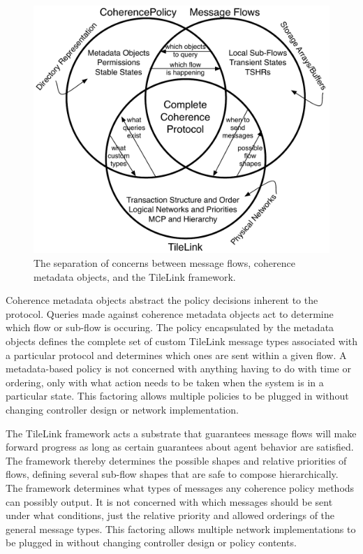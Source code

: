 \begin{figure}[t!]
\centering
\includegraphics[width=1\columnwidth]{coherence/figures/overview.pdf}
\caption[Separation of Concerns.]{
The separation of concerns between message flows, coherence metadata objects, and the TileLink framework.
}
\label{fig:overview}
\end{figure}

Coherence metadata objects abstract the policy decisions inherent to the protocol.
Queries made against coherence metadata objects act to determine which flow or sub-flow is occuring.
The policy encapsulated by the metadata objects defines the complete set of custom TileLink message types
associated with a particular protocol and determines which ones are sent within a given flow.
A metadata-based policy is not concerned with anything having to do with time or ordering,
only with what action needs to be taken when the system is in a particular state.
This factoring allows multiple policies to be plugged in without changing controller design
or network implementation.

The TileLink framework acts a substrate that guarantees message flows will make forward progress
as long as certain guarantees about agent behavior are satisfied.
The framework thereby determines the possible shapes and relative priorities of flows,
defining several sub-flow shapes that are safe to compose hierarchically.
The framework determines what types of messages any coherence policy methods can possibly output.
It is not concerned with which messages should be sent under what conditions,
just the relative priority and allowed orderings of the general message types.
This factoring allows multiple network implementations to be plugged in without changing controller design
or policy contents.

